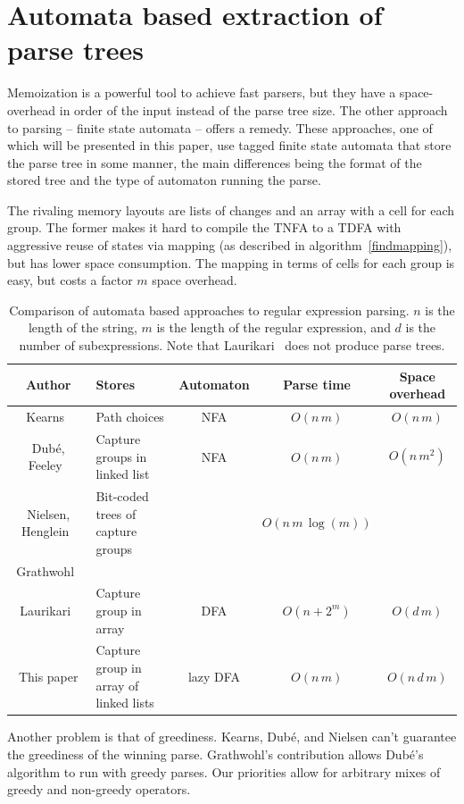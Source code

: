 \documentclass[11pt,a4paper,twoside,openright]{Thesis}
\theoremstyle{definition}
\newcommand{\seclabel}[1]{\label{sec:#1}}
\begin{document}
\section{Automata based extraction of parse trees}\seclabel{parse-trees-related}
Memoization is a powerful tool to achieve fast parsers, but they have a
space-overhead in order of the input instead of the parse tree size. The
other approach to parsing -- finite state automata -- offers a remedy. These
approaches, one of which will be presented in this paper, use tagged finite
state automata that store the parse tree in some manner, the main differences
being the format of the stored tree and the type of automaton running the parse.

The rivaling memory layouts are lists of changes and an array with a cell for
each group. The former makes it hard to compile the TNFA to a TDFA with
aggressive reuse of states via mapping (as described in
algorithm~\ref{findmapping}), but has lower space consumption. The mapping in
terms of cells for each group is easy, but costs a factor $m$ space overhead.

\begin{table}
\begin{tabular}{c|>{\centering}m{3cm}ccc}
  Author & Stores & Automaton & Parse time & Space overhead \\
  \hline
  \hline
  Kearns~\cite{Kear91a}& Path choices & NFA & $O(n\,m)$ & $O(n\, m)$ \\
  \hline
  Dub\'e, Feeley~\cite{Dube00a}& Capture groups in linked
  list & NFA & $O(n\,m)$ & $O(n\, m^2)$\\
  Nielsen, Henglein~\cite{Niel11a} & Bit-coded trees of capture groups  & & $O(n\, m\, \log(m))$ \\
  Grathwohl~\cite{Grat13a} \\
  \hline
  Laurikari~\cite{Laur00a}& Capture group in array & DFA &
  $O(n+2^m)$ & $O(d\, m)$\\
  This paper & Capture group in array of linked lists & lazy DFA
  & $O(n\, m)$ & $O(n\, d\, m)$ \\
\end{tabular}
\caption{Comparison of automata based approaches to regular expression
parsing. $n$ is the length of the string, $m$ is the length of the regular
expression, and $d$ is the number of subexpressions. Note that
Laurikari~\cite{Laur00a} does not produce parse trees.}
\end{table}

Another problem is that of greediness. Kearns, Dub\'e, and Nielsen can't
guarantee the greediness of the winning parse. Grathwohl's contribution
allows Dub\'e's algorithm to run with greedy parses. Our priorities allow for
arbitrary mixes of greedy and non-greedy operators.
\end{document}
